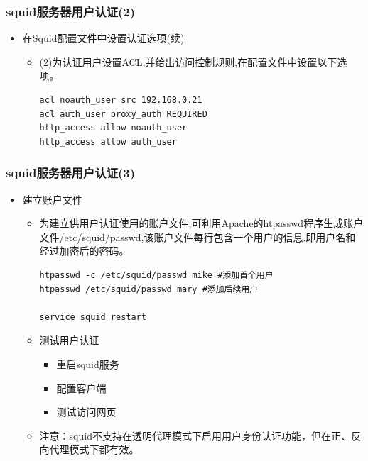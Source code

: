 \documentclass[xcolor=svgnames,presentation]{beamer}
\begin{document}
\begin{frame}[fragile]
\frametitle{squid服务器用户认证(2)}
\label{sec-4-15}
\begin{itemize}

\item 在Squid配置文件中设置认证选项(续)
\label{sec-4-15-1}%
\begin{itemize}

\item (2)为认证用户设置ACL,并给出访问控制规则,在配置文件中设置以下选项。\\
\label{sec-4-15-1-1}%
\begin{verbatim}
acl noauth_user src 192.168.0.21
acl auth_user proxy_auth REQUIRED
http_access allow noauth_user
http_access allow auth_user
\end{verbatim}
\end{itemize} %
\end{itemize} %
\end{frame}
\begin{frame}[fragile]
\frametitle{squid服务器用户认证(3)}
\label{sec-4-16}
\begin{itemize}

\item 建立账户文件
\label{sec-4-16-1}%
\begin{itemize}

\item 为建立供用户认证使用的账户文件,可利用Apache的htpasswd程序生成账户文件/etc/squid/passwd,该账户文件每行包含一个用户的信息,即用户名和经过加密后的密码。\\
\label{sec-4-16-1-1}%
\begin{verbatim}
htpasswd -c /etc/squid/passwd mike #添加首个用户
htpasswd /etc/squid/passwd mary #添加后续用户

service squid restart
\end{verbatim}

\item 测试用户认证
\label{sec-4-16-1-2}%
\begin{itemize}

\item 重启squid服务
\label{sec-4-16-1-2-1}%

\item 配置客户端
\label{sec-4-16-1-2-2}%

\item 测试访问网页
\label{sec-4-16-1-2-3}%
\end{itemize} %

\item 注意：squid不支持在透明代理模式下启用用户身份认证功能，但在正、反向代理模式下都有效。
\label{sec-4-16-1-3}%
\end{itemize} %
\end{itemize} %
\end{frame}
\end{document}
